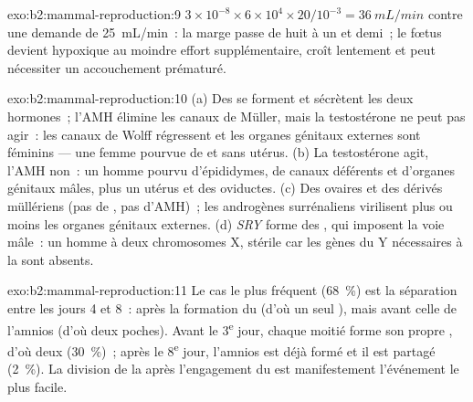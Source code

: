 \begin{solution}{exo:b2:mammal-reproduction:9}
$3\times 10^{-8}\times 6\times 10^{4}\times 20/10^{-3} =
\qty{36}{mL/min}$ contre une demande de \qty{25}{mL/min}~: la marge
passe de huit à un et demi~; le fœtus devient hypoxique au moindre
effort supplémentaire, croît lentement et peut nécessiter un
accouchement prématuré.
\end{solution}

\begin{solution}{exo:b2:mammal-reproduction:10}
(a) Des  se forment et sécrètent les deux hormones~; l'AMH
élimine les canaux de Müller, mais la testostérone ne peut pas agir~:
les canaux de Wolff régressent et les organes génitaux externes sont
féminins --- une femme pourvue de  et sans utérus. (b) La
testostérone agit, l'AMH non~: un homme pourvu d'épididymes, de canaux
déférents et d'organes génitaux mâles, plus un utérus et des oviductes.
(c) Des ovaires et des dérivés müllériens (pas de , pas
d'AMH)~; les androgènes surrénaliens virilisent plus ou moins les organes
génitaux externes. (d)
\emph{SRY} forme des , qui imposent la voie mâle~: un homme à
deux chromosomes X, stérile car les gènes du Y nécessaires à la
 sont absents.
\end{solution}

\begin{solution}{exo:b2:mammal-reproduction:11}
Le cas le plus fréquent (\qty{68}{\%}) est la séparation entre les
jours 4 et 8~: après la formation du  (d'où un seul
), mais avant celle de l'amnios (d'où deux poches). Avant le
3\textsuperscript{e} jour, chaque moitié forme son propre ,
d'où deux  (\qty{30}{\%})~; après le 8\textsuperscript{e} jour,
l'amnios est déjà formé et il est partagé (\qty{2}{\%}). La division de
la  après l'engagement du  est
manifestement l'événement le plus facile.
\end{solution}

